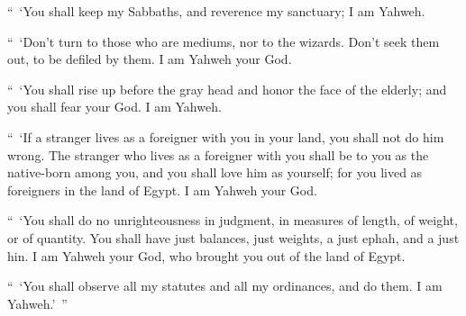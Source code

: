 {\par }{\PP {}“ ‘You shall keep my Sabbaths, and reverence my sanctuary; I am Yahweh.
\par }{\PP {}“ ‘Don’t turn to those who are mediums, nor to the wizards. Don’t seek them out, to be defiled by them. I am Yahweh your God.
\par }{\PP {}“ ‘You shall rise up before the gray head and honor the face of the elderly; and you shall fear your God. I am Yahweh.
\par }{\PP {}“ ‘If a stranger lives as a foreigner with you in your land, you shall not do him wrong.
The stranger who lives as a foreigner with you shall be to you as the native-born among you, and you shall love him as yourself; for you lived as foreigners in the land of Egypt. I am Yahweh your God.
\par }{\PP {}“ ‘You shall do no unrighteousness in judgment, in measures of length, of weight, or of quantity.
You shall have just balances, just weights, a just ephah, and a just hin. I am Yahweh your God, who brought you out of the land of Egypt.
\par }{\PP {}“ ‘You shall observe all my statutes and all my ordinances, and do them. I am Yahweh.’ ”

}
